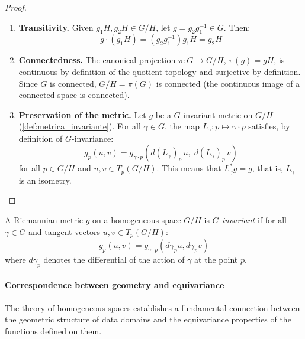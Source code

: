 \begin{proof}
\leavevmode
\begin{enumerate}
    \item \textbf{Transitivity.} Given $g_1H, g_2H \in G/H$, let $g = g_2 g_1^{-1} \in G$. Then:
    \[
    g \cdot (g_1H) = (g_2 g_1^{-1}) g_1 H = g_2 H
    \]

    \item \textbf{Connectedness.} The canonical projection $\pi: G \to G/H$, $\pi(g) = gH$, is continuous by definition of the quotient topology and surjective by definition. Since $G$ is connected, $G/H = \pi(G)$ is connected (the continuous image of a connected space is connected).

    \item \textbf{Preservation of the metric.} Let $g$ be a $G$-invariant metric on $G/H$ (\autoref{def:metrica_invariante}). For all $\gamma \in G$, the map $L_\gamma: p \mapsto \gamma \cdot p$ satisfies, by definition of $G$-invariance:
    \[
    g_p(u, v) = g_{\gamma \cdot p}(d(L_\gamma)_p\, u,\; d(L_\gamma)_p\, v)
    \]
    for all $p \in G/H$ and $u, v \in T_p(G/H)$. This means that $L_\gamma^* g = g$, that is, $L_\gamma$ is an isometry. \qedhere
\end{enumerate}
\end{proof}

\begin{definition}\label{def:metrica_invariante}
A Riemannian metric $g$ on a homogeneous space $G/H$ is \textit{$G$-invariant} if for all $\gamma \in G$ and tangent vectors $u, v \in T_p(G/H)$:
\begin{equation}
g_p(u, v) = g_{\gamma \cdot p}(d\gamma_p u, d\gamma_p v)
\end{equation}
where $d\gamma_p$ denotes the differential of the action of $\gamma$ at the point $p$.
\end{definition}

\paragraph{Correspondence between geometry and equivariance}

The theory of homogeneous spaces establishes a fundamental connection between the geometric structure of data domains and the equivariance properties of the functions defined on them.

